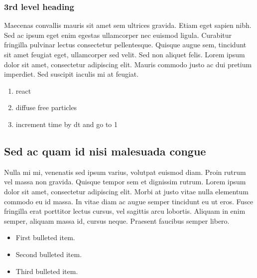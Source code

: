 \documentclass[10pt,letterpaper]{article}
\begin{document}
\subsubsection*{3rd level heading} 
Maecenas convallis mauris sit amet sem ultrices gravida. Etiam eget sapien nibh. Sed ac ipsum eget enim egestas ullamcorper nec euismod ligula. Curabitur fringilla pulvinar lectus consectetur pellentesque. Quisque augue sem, tincidunt sit amet feugiat eget, ullamcorper sed velit. Sed non aliquet felis. Lorem ipsum dolor sit amet, consectetur adipiscing elit. Mauris commodo justo ac dui pretium imperdiet. Sed suscipit iaculis mi at feugiat. 

\begin{enumerate}
	\item{react}
	\item{diffuse free particles}
	\item{increment time by dt and go to 1}
\end{enumerate}


\subsection*{Sed ac quam id nisi malesuada congue}

Nulla mi mi, venenatis sed ipsum varius, volutpat euismod diam. Proin rutrum vel massa non gravida. Quisque tempor sem et dignissim rutrum. Lorem ipsum dolor sit amet, consectetur adipiscing elit. Morbi at justo vitae nulla elementum commodo eu id massa. In vitae diam ac augue semper tincidunt eu ut eros. Fusce fringilla erat porttitor lectus cursus, vel sagittis arcu lobortis. Aliquam in enim semper, aliquam massa id, cursus neque. Praesent faucibus semper libero.

\begin{itemize}
	\item First bulleted item.
	\item Second bulleted item.
	\item Third bulleted item.
\end{itemize}
\end{document}
